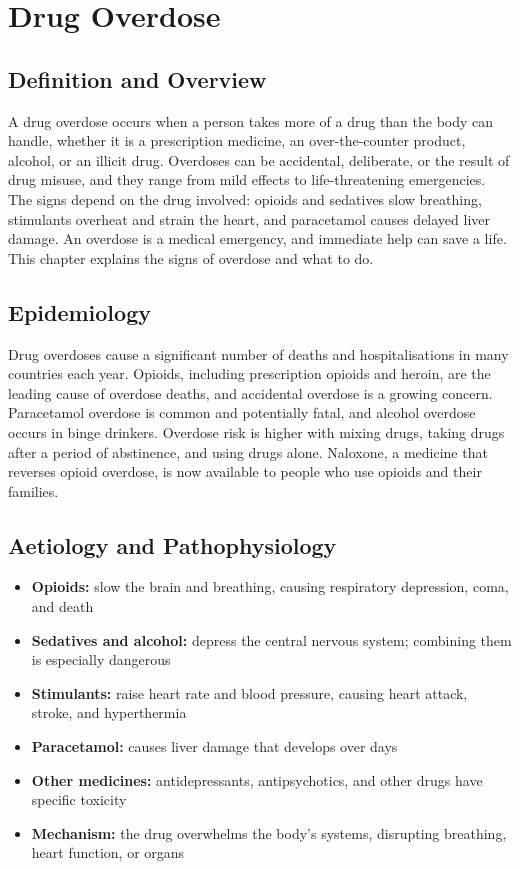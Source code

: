 \chapter{Drug Overdose}

\section*{Definition and Overview}
A drug overdose occurs when a person takes more of a drug than the body can handle, whether it is a prescription medicine, an over-the-counter product, alcohol, or an illicit drug. Overdoses can be accidental, deliberate, or the result of drug misuse, and they range from mild effects to life-threatening emergencies. The signs depend on the drug involved: opioids and sedatives slow breathing, stimulants overheat and strain the heart, and paracetamol causes delayed liver damage. An overdose is a medical emergency, and immediate help can save a life. This chapter explains the signs of overdose and what to do.

\section*{Epidemiology}
Drug overdoses cause a significant number of deaths and hospitalisations in many countries each year. Opioids, including prescription opioids and heroin, are the leading cause of overdose deaths, and accidental overdose is a growing concern. Paracetamol overdose is common and potentially fatal, and alcohol overdose occurs in binge drinkers. Overdose risk is higher with mixing drugs, taking drugs after a period of abstinence, and using drugs alone. Naloxone, a medicine that reverses opioid overdose, is now available to people who use opioids and their families.

\section*{Aetiology and Pathophysiology}
\begin{itemize}
    \item \textbf{Opioids:} slow the brain and breathing, causing respiratory depression, coma, and death
    \item \textbf{Sedatives and alcohol:} depress the central nervous system; combining them is especially dangerous
    \item \textbf{Stimulants:} raise heart rate and blood pressure, causing heart attack, stroke, and hyperthermia
    \item \textbf{Paracetamol:} causes liver damage that develops over days
    \item \textbf{Other medicines:} antidepressants, antipsychotics, and other drugs have specific toxicity
    \item \textbf{Mechanism:} the drug overwhelms the body's systems, disrupting breathing, heart function, or organs
\end{itemize}

